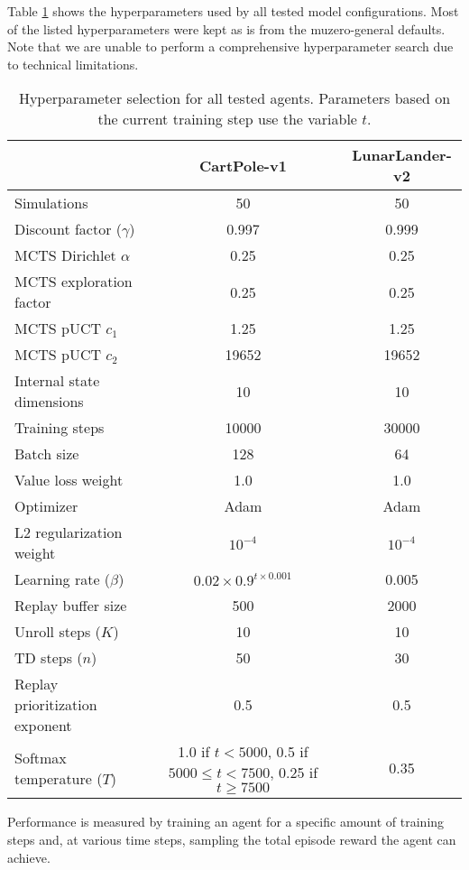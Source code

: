 Table \ref{tab:hyperparameters} shows the hyperparameters used by all tested model configurations. Most of the listed hyperparameters were kept as is from the muzero-general defaults. Note that we are unable to perform a comprehensive hyperparameter search due to technical limitations.
\begin{table}[ht]
    \centering
    \begin{tabular}{|l||c|c|}
        \hline
        & CartPole-v1 & LunarLander-v2 \\
        \hline\hline
        Simulations & 50 & 50 \\
        \hline
        Discount factor ($\gamma$) & 0.997 & 0.999 \\
        \hline
        MCTS Dirichlet $\alpha$ & 0.25 & 0.25 \\
        \hline
        MCTS exploration factor & 0.25 & 0.25 \\
        \hline
        MCTS pUCT $c_1$ & 1.25 & 1.25 \\
        \hline
        MCTS pUCT $c_2$ & 19652 & 19652 \\
        \hline
        Internal state dimensions & 10 & 10 \\
        \hline
        Training steps & 10000 & 30000 \\
        \hline
        Batch size & 128 & 64 \\
        \hline
        Value loss weight & 1.0 & 1.0 \\
        \hline
        Optimizer & Adam & Adam \\
        \hline
        L2 regularization weight & $10^{-4}$ & $10^{-4}$ \\
        \hline
        Learning rate ($\beta$) & $0.02 \times 0.9^{t \times 0.001}$ & 0.005 \\
        \hline
        Replay buffer size & 500 & 2000 \\
        \hline
        Unroll steps ($K$) & 10 & 10 \\
        \hline
        TD steps ($n$) & 50 & 30 \\
        \hline
        Replay prioritization exponent & 0.5 & 0.5 \\
        \hline
        Softmax temperature ($T$) & \makecell{
            1.0 if $t<5000$, \\ 0.5 if $5000 \leq t < 7500$, \\ 0.25 if $t \geq 7500$
        } & 0.35 \\
        \hline
    \end{tabular}
    \caption{Hyperparameter selection for all tested agents. Parameters based on the current training step use the variable $t$.}
    \label{tab:hyperparameters}
\end{table}

 Performance is measured by training an agent for a specific amount of training steps and, at various time steps, sampling the total episode reward the agent can achieve.
